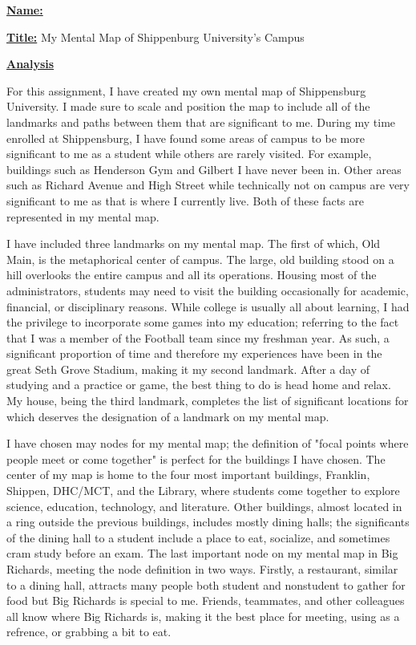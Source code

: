 \documentclass{article}
\author{Ryan Bruno}
\date{\today}
\renewcommand{\maketitle}{
\textbf{\underline{Name:}}
\theauthor

\textbf{\underline{Title:}}
My Mental Map of Shippenburg University's Campus
}
\begin{document}
\maketitle

\textbf{\underline{Analysis}}

\setlength{\parindent}{5ex}
For this assignment, I have created my own mental map of Shippensburg University. I made sure to scale and position the map to include all of the landmarks and paths between them that are significant to me. During my time enrolled at Shippensburg, I have found some areas of campus to be more significant to me as a student while others are rarely visited. For example, buildings such as Henderson Gym and Gilbert I have never been in. Other areas such as Richard Avenue and High Street while technically not on campus are very significant to me as that is where I currently live. Both of these facts are represented in my mental map. 

I have included three landmarks on my mental map. The first of which, Old Main, is the metaphorical center of campus. The large, old building stood on a hill overlooks the entire campus and all its operations. Housing most of the administrators, students may need to visit the building occasionally for academic, financial, or disciplinary reasons. While college is usually all about learning, I had the privilege to incorporate some games into my education; referring to the fact that I was a member of the Football team since my freshman year. As such, a significant proportion of time and therefore my experiences have been in the great Seth Grove Stadium, making it my second landmark. After a day of studying and a practice or game, the best thing to do is head home and relax. My house, being the third landmark, completes the list of significant locations for which deserves the designation of a landmark on my mental map.

I have chosen may nodes for my mental map; the definition of "focal points where people meet or come together" is perfect for the buildings I have chosen. The center of my map is home to the four most important buildings, Franklin, Shippen, DHC/MCT, and the Library, where students come together to explore science, education, technology, and literature. Other buildings, almost located in a ring outside the previous buildings, includes mostly dining halls; the significants of the dining hall to a student include a place to eat, socialize, and sometimes cram study before an exam. The last important node on my mental map in Big Richards, meeting the node definition in two ways. Firstly, a restaurant, similar to a dining hall, attracts many people both student and nonstudent to gather for food but Big Richards is special to me. Friends, teammates, and other colleagues all know where Big Richards is, making it the best place for meeting, using as a refrence, or grabbing a bit to eat. 
\end{document}
